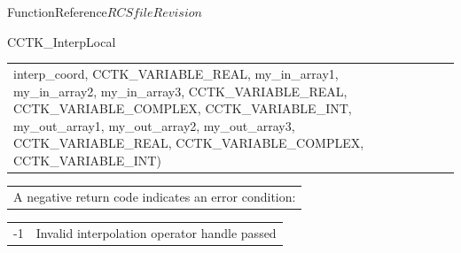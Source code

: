 \begin{cactuspart}{FunctionReference}{$RCSfile$}{$Revision$}
\begin{CCTKFunc}{CCTK\_InterpLocal}
\begin{examples}
\begin{tabular}{@{}p{3cm}cp{11cm}}
{\hspace{2ex} interp\_coord,\vfill
\hspace{2ex} CCTK\_VARIABLE\_REAL,\vfill
\hspace{2ex} my\_in\_array1, my\_in\_array2, my\_in\_array3,\vfill
\hspace{2ex} CCTK\_VARIABLE\_REAL, CCTK\_VARIABLE\_COMPLEX,\vfill
\hspace{2ex} CCTK\_VARIABLE\_INT,\vfill
\hspace{2ex} my\_out\_array1, my\_out\_array2, my\_out\_array3,\vfill
\hspace{2ex} CCTK\_VARIABLE\_REAL, CCTK\_VARIABLE\_COMPLEX,\vfill
\hspace{2ex} CCTK\_VARIABLE\_INT)
}
\\
\end{tabular}
\end{examples}
\begin{errorcodes}
\begin{tabular}{l}
A negative return code indicates an error condition:
\end{tabular}
\begin{tabular}{ll}
-1 & Invalid interpolation operator handle passed\\
\end{tabular}
\end{errorcodes}
\end{CCTKFunc}



\end{cactuspart}
